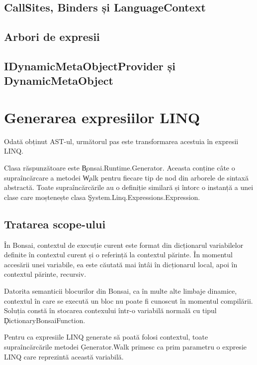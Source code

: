 \documentclass[12pt,a4paper]{memoir}
\begin{document}

\subsection{CallSites, Binders și LanguageContext}


\subsection{Arbori de expresii}


\subsection{IDynamicMetaObjectProvider și DynamicMetaObject}


\section{Generarea expresiilor LINQ}

Odată obținut AST-ul, următorul pas este transformarea acestuia în expresii LINQ\cite{linq_expressions}. 

Clasa răspunzătoare este \c{Bonsai.Runtime.Generator}. Aceasta conține câte o supraîncărcare a metodei \c{Walk} pentru fiecare tip de nod din arborele de sintaxă abstractă. Toate supraîncărcările au o definiție similară și întorc o instanță a unei clase care moștenește clasa \c{System.Linq.Expressions.Expression}.

\subsection{Tratarea scope-ului} 

În Bonsai, contextul de execuție curent este format din dicționarul variabilelor definite în contextul curent și o referință la contextul părinte. În momentul accesării unei variabile, ea este căutată mai întâi în dicționarul local, apoi în contextul părinte, recursiv.

Datorita semanticii blocurilor din Bonsai, ca în multe alte limbaje dinamice, contextul în care se execută un bloc nu poate fi cunoscut în momentul compilării. Soluția constă în stocarea contexului într-o variabilă normală cu tipul \c{DictionaryBonsaiFunction}. 

Pentru ca expresiile LINQ generate să poată folosi contextul, toate supraîncărcările metodei \c{Generator.Walk} primesc ca prim parametru o expresie LINQ care reprezintă această variabilă.
\end{document}
